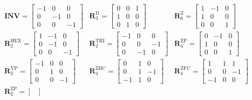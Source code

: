 \documentclass{article}      %
\begin{document}
\begin{displaymath}
	\begin{matrix}
		\mathbf{INV}=
	\begin{bmatrix}
		-1 & 0 & 0\\
		0 & -1 & 0\\
		0 & 0 & -1
	\end{bmatrix}&\mathbf{R}_3^\mathrm{D}=
	\begin{bmatrix}
		0 & 0 & 1\\
		1 & 0 & 0\\
		0 & 1 & 0
	\end{bmatrix}&\mathbf{R}_6^\mathrm{Z}=
	\begin{bmatrix}
		1 & -1 & 0\\
		1 & 0 & 0\\
		0 & 0 & 1
	\end{bmatrix}\\\mathbf{R}_2^\mathrm{HEX}=
	\begin{bmatrix}
		1 & -1 & 0\\
		0 & -1 & 0\\
		0 & 0 & -1
	\end{bmatrix}&\mathbf{R}_2^\mathrm{TRI}=
	\begin{bmatrix}
		-1 & 0 & 0\\
		0 & 0 & -1\\
		0 & -1 & 0
	\end{bmatrix}&\mathbf{R}_4^\mathrm{ZP}=
	\begin{bmatrix}
		0 & -1 & 0\\
		1 & 0 & 0\\
		0 & 0 & 1
	\end{bmatrix}\\\mathbf{R}_2^\mathrm{YP}=
	\begin{bmatrix}
		-1 & 0 & 0\\
		0 & 1 & 0\\
		0 & 0 & -1
	\end{bmatrix}&\mathbf{R}_4^\mathrm{ZBC}=
	\begin{bmatrix}
		0 & 1 & 0\\
		0 & 1 & -1\\
		-1 & 1 & 0
	\end{bmatrix}&\mathbf{R}_4^\mathrm{ZFC}=
	\begin{bmatrix}
		1 & 1 & 1\\
		0 & 0 & -1\\
		-1 & 0 & 0
	\end{bmatrix}\\\mathbf{R}_2^\mathrm{ZP}=
	\begin{bmatrix}

\end{bmatrix}
\end{matrix}
\end{displaymath}
\end{document}
